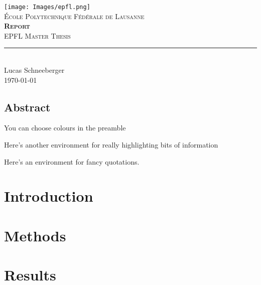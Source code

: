 \documentclass[11pt]{report}
\begin{document}
\begin{titlepage}
	\centering
    \texttt{[image: Images/epfl.png]}\\[0.25cm] 	%
    \textsc{\LARGE École Polytechnique Fédérale de Lausanne}\\ \vspace{\fill}
    \textbf{\textsc{\fontsize{50}{50}\selectfont Report}}\\ \vspace{\fill}		
	\textsc{\LARGE EPFL Master Thesis}\\[0.4cm]
	\rule{\linewidth}{0.2 mm} \\[0.5 cm]
	Lucas Schneeberger \\[2cm] \today
\end{titlepage}
\restoregeometry

\thispagestyle{numberonly}

\begin{summary}
\section*{Abstract}

You can choose colours in the preamble

\lipsum[1]
\end{summary}

\begin{invsummary}
Here's another environment for really highlighting bits of information

\lipsum[2]
\end{invsummary}

\begin{fquote}Here's an environment for fancy quotations. \lipsum[3]
\end{fquote}

\tableofcontents

\chapter{Introduction}


\chapter{Methods}


\chapter{Results}

\end{document}
